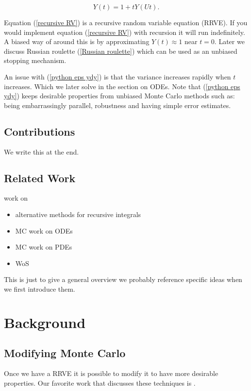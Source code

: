 \documentclass[a4paper,12pt]{article}
\begin{document}
\begin{equation}\label{recursive RV}
    Y(t) = 1 + tY(Ut).
\end{equation}

Equation (\ref{recursive RV}) is a recursive random variable equation (RRVE). If you would implement equation
(\ref{recursive RV}) with recursion it will run indefinitely. A biased way of around this is by approximating
$Y(t) \approx 1$ near $t = 0$. Later we discuss Russian roulette (\ref{Russian roulette}) which
can be used as an unbiased stopping mechanism. \\

\begin{python} \label{python eps ydy}
\end{python}

An issue with (\ref{python eps ydy}) is that the variance increases rapidly when $t$ increases. Which we
later solve in the section on ODEs. Note that (\ref{python eps ydy}) keeps desirable properties
from unbiased Monte Carlo methods such as: being embarrassingly parallel,
robustness and having simple error estimates.


\subsection{Contributions}
We write this at the end.

\subsection{Related Work}
work on
\begin{itemize}
    \item alternative methods for recursive integrals
    \item MC work on ODEs
    \item MC work on PDEs
    \item WoS
\end{itemize}
This is just to give a general overview we probably reference specific ideas when we first introduce them.

\section{Background}
\subsection{Modifying Monte Carlo}
Once we have a RRVE it is possible to modify it
to have more desirable properties.
Our favorite work that discusses these techniques is \cite{veach_robust_nodate}.
\end{document}
